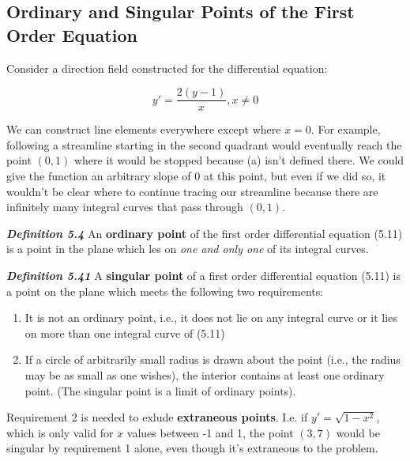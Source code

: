 \documentclass{article}
\begin{document}
\subsection{Ordinary and Singular Points of the First Order Equation}

Consider a direction field constructed for the differential equation:

\[ y' = \frac{2(y-1)}{x}, x \neq 0 \tag{a} \]

We can construct line elements everywhere except where $x = 0$. For example, following a streamline starting in the second quadrant would eventually reach the point $(0,1)$ where it would be stopped because (a) isn't defined there. We could give the function an arbitrary slope of 0 at this point, but even if we did so, it wouldn't be clear where to continue tracing our streamline because there are infinitely many integral curves that pass through $(0,1)$. 

\emph{\textbf{Definition 5.4}} An \textbf{ordinary point} of the first order differential equation (5.11) is a point in the plane which les on \emph{one and only one} of its integral curves.

\emph{\textbf{Definition 5.41}} A \textbf{singular point} of a first order differential equation (5.11) is a point on the plane which meets the following two requirements:

\begin{enumerate}
\item It is not an ordinary point, i.e., it does not lie on any integral curve or it lies on more than one integral curve of (5.11)
\item If a circle of arbitrarily small radius is drawn about the point (i.e., the radius may be as small as one wishes), the interior contains at least one ordinary point. (The singular point is a limit of ordinary points).
\end{enumerate}

Requirement 2 is needed to exlude \textbf{extraneous points}. I.e. if $y' = \sqrt{1 -x^2}$, which is only valid for $x$ values between -1 and 1, the point $(3,7)$ would be singular by requirement 1 alone, even though it's extraneous to the problem.
\end{document}
